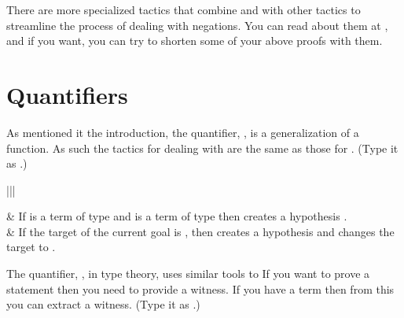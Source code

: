\documentclass[letterpaper,10pt,english]{sphinxmanual}
\begin{document}
\sphinxAtStartPar
There are more specialized tactics that combine  and  with other tactics to streamline the process of dealing with negations.
You can read about them at {\hyperref[\detokenize{tactics::doc}]{}}, and if you want, you can try to shorten some of your above proofs with them.


\section{Quantifiers}
\label{\detokenize{day2:quantifiers}}
\sphinxAtStartPar
As mentioned it the introduction, the  quantifier, , is a generalization of a function.
As such the tactics for dealing with  are the same as those for .
(Type it as .)


\begin{savenotes}\sphinxattablestart
\centering
\begin{tabular}[t]{|||}
\hline

\sphinxAtStartPar
{}
&
\sphinxAtStartPar
If  is a term of type  and
 is a term of type  then
 creates a hypothesis .
\\
\hline
\sphinxAtStartPar
{}
&
\sphinxAtStartPar
If the target of the current goal is , then
 creates a hypothesis  and
changes the target to .
\\
\hline
\end{tabular}
\par
\sphinxattableend\end{savenotes}

\sphinxAtStartPar
The  quantifier, , in type theory, uses similar tools to
If you want to prove a statement  then you need to provide a witness.
If you have a term  then from this you can extract a witness.
(Type it as .)
\end{document}
